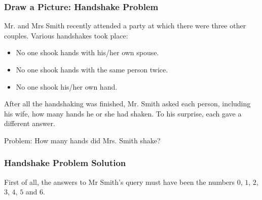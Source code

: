 \documentclass{beamer}
\begin{document}
\begin{frame}%
\frametitle{Draw a Picture: Handshake Problem}

Mr. and Mrs Smith recently attended a party at which there were three other couples.
Various handshakes took place:
\begin{itemize}
\item<2-> No one shook hands with his/her own spouse.
\vspace{0.2cm}
\item<3-> No one shook hands with the same person twice.
\vspace{0.2cm}
\item<4-> No one shook his/her own hand.
\vspace{0.2cm}
\end{itemize}
After all the handshaking was finished, Mr. Smith asked each person, including his wife, how many hands he or she had shaken.
 To his surprise, each gave a different answer.

\begin{mdframed}[style=exampledefault]
Problem: How many hands did Mrs. Smith shake?
\end{mdframed}

\end{frame}

\ifanswers
\begin{frame}%
\frametitle{Handshake Problem Solution}

First of all, the answers to Mr Smith's query must have been the numbers $0$, $1$, $2$, $3$, $4$, $5$ and $6$.


\end{frame}
\end{document}
